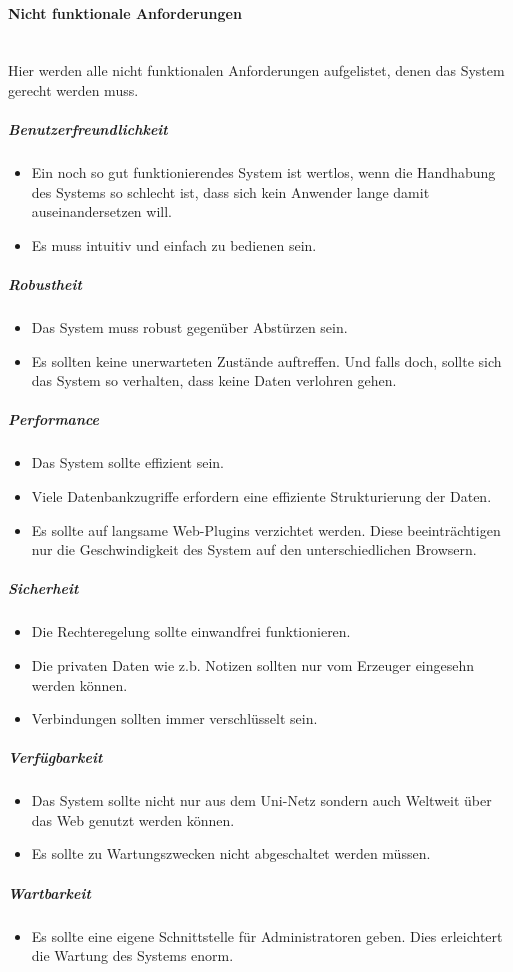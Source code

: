 \documentclass[12pt,a4paper]{article}
\begin{document}
\paragraph{Nicht funktionale Anforderungen}\mbox{}\\
Hier werden alle nicht funktionalen Anforderungen aufgelistet, denen das System gerecht werden muss.
\subparagraph{Benutzerfreundlichkeit}
\begin{itemize}
\item Ein noch so gut funktionierendes System ist wertlos, wenn die Handhabung des Systems so schlecht ist, dass sich kein Anwender lange damit auseinandersetzen will. 
\item Es muss intuitiv und einfach zu bedienen sein.
\end{itemize}
\subparagraph{Robustheit}
\begin{itemize}
\item Das System muss robust gegenüber Abstürzen sein. 
\item Es sollten keine unerwarteten Zustände auftreffen. Und falls doch, sollte sich das System so verhalten, dass keine Daten verlohren gehen.
\end{itemize}
\subparagraph{Performance}
\begin{itemize}
\item Das System sollte effizient sein.
\item Viele Datenbankzugriffe erfordern eine effiziente Strukturierung der Daten.
\item Es sollte auf langsame Web-Plugins verzichtet werden. Diese beeinträchtigen nur die Geschwindigkeit des System auf den unterschiedlichen Browsern.
\end{itemize}
\subparagraph{Sicherheit}
\begin{itemize}
\item Die Rechteregelung sollte einwandfrei funktionieren.
\item Die privaten Daten wie z.b. Notizen sollten nur vom Erzeuger eingesehn werden können.
\item Verbindungen sollten immer verschlüsselt sein.
\end{itemize}
\subparagraph{Verfügbarkeit}
\begin{itemize}
\item Das System sollte nicht nur aus dem Uni-Netz sondern auch Weltweit über das Web genutzt werden können.
\item Es sollte zu Wartungszwecken nicht abgeschaltet werden müssen.
\end{itemize}
\subparagraph{Wartbarkeit}
\begin{itemize}
\item Es sollte eine eigene Schnittstelle für Administratoren geben. Dies erleichtert die Wartung des Systems enorm.
\end{itemize}
\end{document}
